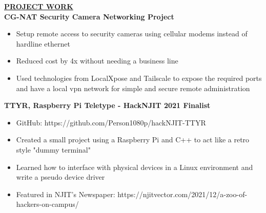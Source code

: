 \documentclass{article}
\begin{document}
%
%
\noindent \textbf{\underline{PROJECT WORK}} \\
\noindent \textbf{CG-NAT Security Camera Networking Project} 
\begin{itemize}[noitemsep,nolistsep,leftmargin=*]
\item {Setup remote access to security cameras using cellular modems instead of hardline ethernet}
\item {Reduced cost by 4x without needing a business line}
\item {Used technologies from LocalXpose and Tailscale to expose the required ports and have a local vpn network for simple and secure remote administration}
\end{itemize}

\noindent \textbf{TTYR, Raspberry Pi Teletype - HackNJIT 2021 Finalist} 
\begin{itemize}[noitemsep,nolistsep,leftmargin=*]
\item {GitHub: https://github.com/Person1080p/hackNJIT-TTYR}
\item {Created a small project using a Raspberry Pi and C++ to act like a retro style "dummy terminal"}
\item {Learned how to interface with physical devices in a Linux environment and write a pseudo device driver}
\item {Featured in NJIT's Newspaper: https://njitvector.com/2021/12/a-zoo-of-hackers-on-campus/}
\\
\end{itemize}
\end{document}
